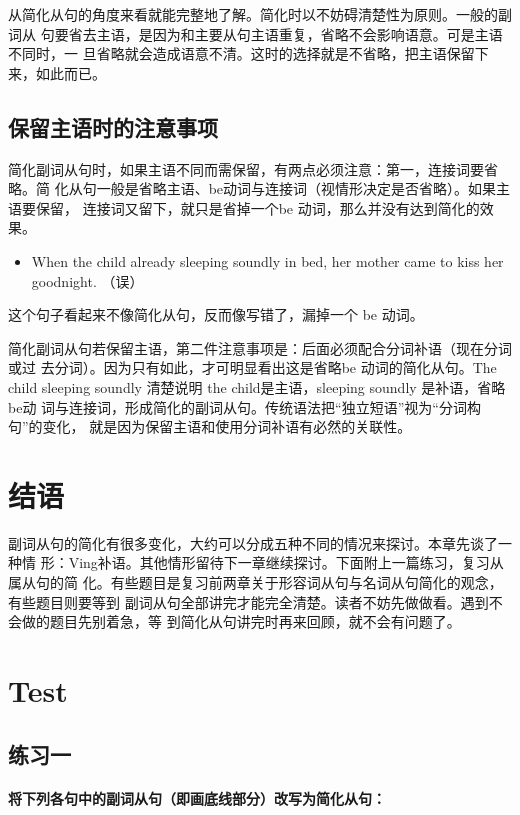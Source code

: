 从简化从句的角度来看就能完整地了解。简化时以不妨碍清楚性为原则。一般的副词从
句要省去主语，是因为和主要从句主语重复，省略不会影响语意。可是主语不同时，一
旦省略就会造成语意不清。这时的选择就是不省略，把主语保留下来，如此而已。

\subsection{保留主语时的注意事项}

简化副词从句时，如果主语不同而需保留，有两点必须注意：第一，连接词要省略。简
化从句一般是省略主语、be动词与连接词（视情形决定是否省略）。如果主语要保留，
连接词又留下，就只是省掉一个be 动词，那么并没有达到简化的效果。

\begin{itemize}
\item   When the child already sleeping soundly in bed, her mother came to
  kiss her goodnight. （误）
\end{itemize}
这个句子看起来不像简化从句，反而像写错了，漏掉一个 be 动词。

简化副词从句若保留主语，第二件注意事项是：后面必须配合分词补语（现在分词或过
去分词）。因为只有如此，才可明显看出这是省略be 动词的简化从句。The child
sleeping soundly 清楚说明 the child是主语，sleeping soundly 是补语，省略 be动
词与连接词，形成简化的副词从句。传统语法把“独立短语”视为“分词构句”的变化，
就是因为保留主语和使用分词补语有必然的关联性。

\section{结语}

副词从句的简化有很多变化，大约可以分成五种不同的情况来探讨。本章先谈了一种情
形：Ving补语。其他情形留待下一章继续探讨。下面附上一篇练习，复习从属从句的简
化。有些题目是复习前两章关于形容词从句与名词从句简化的观念，有些题目则要等到
副词从句全部讲完才能完全清楚。读者不妨先做做看。遇到不会做的题目先别着急，等
到简化从句讲完时再来回顾，就不会有问题了。

\section{Test}

\subsection{练习一}

\paragraph{将下列各句中的副词从句（即画底线部分）改写为简化从句：}


